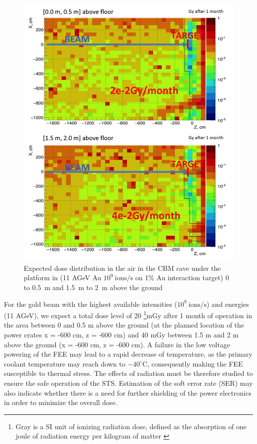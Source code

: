 \begin{figure}[!h]
    \centering
    \includegraphics[width=0.55\columnwidth]{Chapter4/images/Dose00.jpg}
    \caption{Expected dose distribution in the air in the \gls{CBM}
cave under the platform in (11 AGeV Au $10^{9} \mathrm{\ ions/s}$ on 1\% Au
interaction target) 0 to 0.5 m and 1.5 m to 2 m above the ground} 
    \label{fig:mCBM}
\end{figure}
For the gold beam with the highest available intensities ($10^{9}\mathrm{\ ions/s}$) and energies (11 AGeV), we expect a total dose level of 20 \footnote{Gray is a SI unit of ionizing radiation dose, defined as the absorption of one joule of radiation energy per kilogram of matter \cite{gray}}{mGy} after 1 month of operation in the area between 0 and 0.5 m above the ground (at the planned location of the power crates x = -600 cm, z = -600 cm) and 40 mGy between 1.5 m and 2 m above the ground (x = -600 cm, z = -600 cm). A failure in the low voltage powering of the FEE may lead to a rapid decrease of temperature, as the primary coolant temperature may reach down to $-40^{\circ}\mathrm{C}$, consequently making the FEE susceptible to thermal stress. The effects of radiation must be therefore studied to ensure the safe operation of the STS. Estimation of the soft error rate (\gls{SER}) may also indicate whether there is a need for further shielding of the power electronics in order to minimize the overall dose.

\newpage
